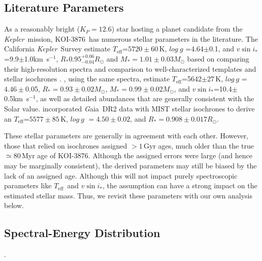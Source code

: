 \documentclass[twocolumn]{aastex631}
\newcommand{\starname}{KOI-3876}
\newcommand{\vsini}{$v\sin{i_*}$}
\newcommand{\kepler}{{\it Kepler}}
\newcommand{\logg}{$log~g$ }
\newcommand{\teff}{\ensuremath{T_{\text{eff}}}}
\newcommand\kms{km~s$^{-1}$}
\newcommand{\gaia}{{\textit Gaia}}
\begin{document}
\subsection{Literature Parameters}
As a reasonably bright ($K_P=12.6$) star hosting a planet candidate from the \kepler\ mission, \starname\ has numerous stellar parameters in the literature. The California \kepler\ Survey estimate \teff=$5720\pm60$\,K, \logg=4.64$\pm$0.1, and \vsini=9.9$\pm$1.0\kms, $R_*0.95^{+0.06}_{-0.04}R_\odot$ and $M_*=1.01\pm0.03M_\odot$ based on comparing their high-resolution spectra and comparison to well-characterized templates \citep{2017AJ....154..107P, 2017ApJ...836...77Y} and stellar isochrones \citep{JohsonCKS2017}. \citet{2018ApJS..237...38B}, using the same spectra, estimate \teff=5642$\pm$27\,K, \logg=$4.46\pm$0.05, $R_*=0.93\pm0.02M_\odot$, $M_*=0.99\pm0.02M_\odot$, and \vsini=10.4$\pm$0.5\kms, as well as detailed abundances that are generally consistent with the Solar value. \citet{2020AJ....160..108B} incorporated \gaia\ DR2 data with MIST stellar isochrones to derive an \teff=$5577\pm85$\,K, \logg$=4.50\pm0.02$, and $R_*=0.908\pm0.017R_\odot$. 

These stellar parameters are generally in agreement with each other. However, those that relied on isochrones \citep{JohsonCKS2017, 2018ApJS..237...38B, 2020AJ....160..108B} assigned $>1$\,Gyr ages, much older than the true $\simeq$80\,Myr age of \starname. Although the assigned errors were large (and hence may be marginally consistent), the derived parameters may still be biased by the lack of an assigned age. Although this will not impact purely spectroscopic parameters like \teff\ and \vsini, the assumption can have a strong impact on the estimated stellar mass. Thus, we revisit these parameters with our own analysis below. 

\subsection{Spectral-Energy Distribution}.
\end{document}
